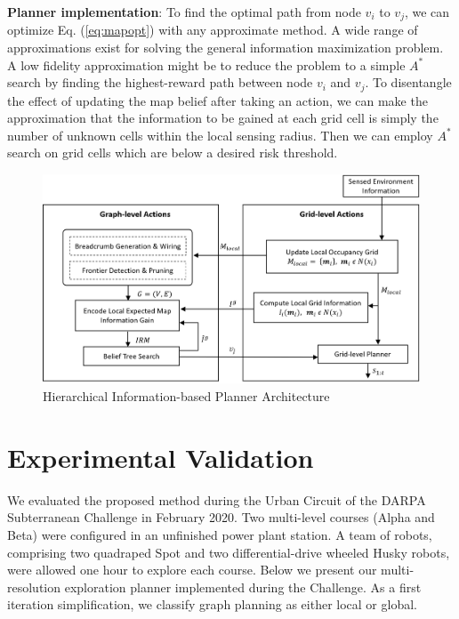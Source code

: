 \documentclass[letterpaper, 10 pt, conference]{ieeeconf}  %
\newcommand{\ph}[1]{{\textbf{#1}:}} %
\begin{document}
\ph{Planner implementation}
To find the optimal path from node $v_i$ to $v_j$, we can optimize Eq. (\ref{eq:mapopt}) with any approximate method.  A wide range of approximations exist for solving the general information maximization problem.  A low fidelity approximation might be to reduce the problem to a simple $A^*$ search by finding the highest-reward path between node $v_i$ and $v_j$.  To disentangle the effect of updating the map belief after taking an action, we can make the approximation that the information to be gained at each grid cell is simply the number of unknown cells within the local sensing radius.  Then we can employ $A^*$ search on grid cells which are below a desired risk threshold.

\begin{figure}[ht!]
  \includegraphics[width=.48\textwidth]{figures/structure_v5.png}
  \centering
  \caption{Hierarchical Information-based Planner Architecture}
  \label{fig:architecture}
\end{figure}

\section{Experimental Validation}\label{sec:urban}
We evaluated the proposed method during the Urban Circuit of the DARPA Subterranean Challenge in February 2020. Two multi-level courses (Alpha and Beta) were configured in an unfinished power plant station. A team of robots, comprising two quadraped Spot and two differential-drive wheeled Husky robots, were allowed one hour to explore each course. Below we present our multi-resolution exploration planner implemented during the Challenge. As a first iteration simplification, we classify graph planning as either local or global. 
\end{document}
